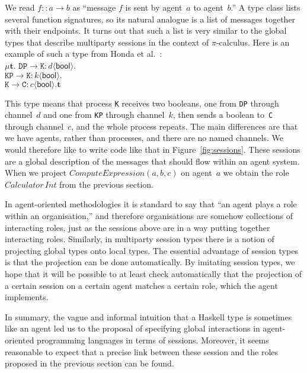 \documentclass[a4paper,12pt,oneside,fleqn]{book} %
\theoremstyle{plain}
\theoremstyle{definition}
\theoremstyle{remark}
\begin{document}
{\def\l#1->#2:#3<#4>{\mathtt{#1}\to\mathtt{#2}:#3\langle\mathsf{#4}\rangle}
We read $f::a\to b$ as ``message $f$ is sent by agent~$a$ to agent~$b$.'' A
type class lists several function signatures, so its natural analogue is a
list of messages together with their endpoints. It turns out that such a
list is very similar to the global types that describe multiparty sessions
in the context of $\pi$-calculus. Here is an example of such a type from
Honda et al.~\cite{dblp:conf/popl/hondayc08}:\\
$\mu\mathbf{t}.$
  $\l DP->K:d<bool>. $\\
  $\l KP->K:k<bool>. $\\
  $\l K->C:c<bool>.\mathbf{t}$

This type means that process \texttt{K} receives two booleans, one from
\texttt{DP} through channel~$d$ and one from \texttt{KP} through channel~$k$,
then sends a boolean to~\texttt{C} through channel~$c$, and the whole process
repeats. The main differences are that we have agents, rather than processes,
and there are no named channels. We would therefore like to write code like
that in Figure~\ref{fig:sessions}.  These sessions are a global description of
the messages that should flow within an agent system. When we project
$\mathit{ComputeExpression}(a,b,c)$ on agent~$a$ we obtain the role
$\mathit{Calculator}\,\mathit{Int}$ from the previous section.}

In agent-oriented methodologies it is standard to say that ``an agent plays
a role within an organisation,'' and therefore organisations are somehow
collections of interacting roles, just as the sessions above are in a way
putting together interacting roles. Similarly, in multiparty session types
there is a notion of projecting global types onto local types. The
essential advantage of session types is that the projection can be done
automatically. By imitating session types, we hope that it will be possible
to at least check automatically that the projection of a certain session on
a certain agent matches a certain role, which the agent implements.

In summary, the vague and informal intuition that a Haskell type is
sometimes like an agent led us to the proposal of specifying global
interactions in agent-oriented programming languages in terms of sessions.
Moreover, it seems reasonable to expect that a precise link between these
session and the roles proposed in the previous section can be found.

\end{document}
